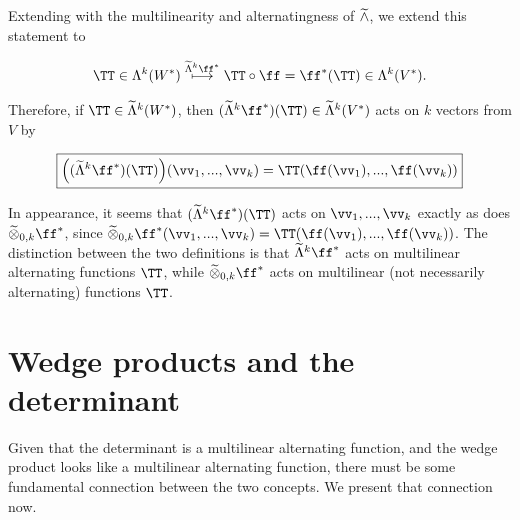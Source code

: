 \begin{deriv}
    Extending with the multilinearity and alternatingness of $\widetilde{\wedge}$, we extend this statement to
    
    \begin{align*}
        \TT \in \Lambda^k(W^*) \overset{\tLambda^k \ff^*}{\longmapsto} \TT \circ \ff = \ff^*(\TT) \in \Lambda^k(V^*).
    \end{align*}
    
    Therefore, if $\TT \in \tLambda^k(W^*)$, then $(\tLambda^k \ff^*)(\TT) \in \tLambda^k(V^*)$ acts on $k$ vectors from $V$ by
    
    \begin{align*}
        \boxed
        {
            \Big((\tLambda^k \ff^*)(\TT)\Big)(\vv_1, ..., \vv_k) = \TT(\ff(\vv_1), ..., \ff(\vv_k))
        }
    \end{align*}
    
    In appearance, it seems that $(\tLambda^k \ff^*)(\TT)$ acts on $\vv_1, ..., \vv_k$ exactly as does $\totimes_{0,k} \ff^*$, since $\totimes_{0,k} \ff^*(\vv_1, ..., \vv_k) = \TT(\ff(\vv_1), ..., \ff(\vv_k))$. The distinction between the two definitions is that $\tLambda^k \ff^*$ acts on multilinear alternating functions $\TT$, while $\totimes_{0,k} \ff^*$ acts on multilinear (not necessarily alternating) functions $\TT$.
\end{deriv}

\newpage

\section{Wedge products and the determinant}

Given that the determinant is a multilinear alternating function, and the wedge product looks like a multilinear alternating function, there must be some fundamental connection between the two concepts. We present that connection now.

